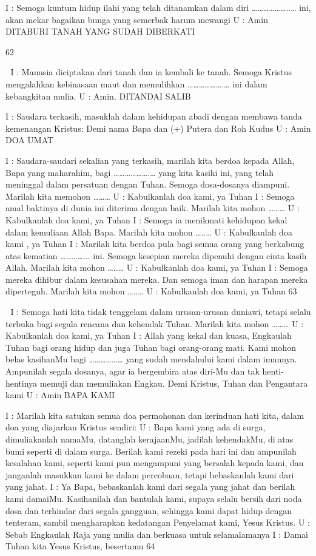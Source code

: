\documentclass[10pt,a5paper,fancyhdr]{memoir}
\begin{document}
I : Semoga kuntum hidup ilahi yang telah ditanamkan dalam diri 
………………..… ini, akan mekar bagaikan bunga yang semerbak 
harum mewangi 
U : Amin 
DITABURI TANAH YANG SUDAH DIBERKATI 

62 



I : Manusia diciptakan dari tanah dan ia kembali ke tanah. Semoga 
Kristus mengalahkan kebinasaan maut dan memulihkan 
……………….… ini dalam kebangkitan mulia. 
U : Amin. 
DITANDAI SALIB 

I : Saudara terkasih, masuklah dalam kehidupan abadi dengan 
membawa tanda kemenangan Kristus: Demi nama Bapa dan (+) 
Putera dan Roh Kudus 
U : Amin 
DOA UMAT 

I : Saudara-saudari sekalian yang terkasih, marilah kita berdoa 
kepada Allah, Bapa yang maharahim, bagi ……………….… yang 
kita kasihi ini, yang telah meninggal dalam persatuan dengan Tuhan. 
Semoga dosa-dosanya diampuni. Marilah kita memohon ……… 
U : Kabulkanlah doa kami, ya Tuhan 
I : Semoga amal baktinya di dunia ini diterima dengan baik. Marilah 
kita mohon ……… 
U : Kabulkanlah doa kami, ya Tuhan 
I : Semoga ia menikmati kehidupan kekal dalam kemuliaan Allah 
Bapa. Marilah kita mohon …..… 
U : Kabulkanlah doa kami , ya Tuhan 
I : Marilah kita berdoa pula bagi semua orang yang berkabung atas 
kematian …………... ini. Semoga kesepian mereka dipenuhi dengan 
cinta kasih Allah. Marilah kita mohon …..… 
U : Kabulkanlah doa kami, ya Tuhan 
I : Semoga mereka dihibur dalam kesusahan mereka. Dan semoga 
iman dan harapan mereka diperteguh. Marilah kita mohon …..… 
U : Kabulkanlah doa kami, ya Tuhan 
63 



I : Semoga hati kita tidak tenggelam dalam urusan-urusan duniawi, 
tetapi selalu terbuka bagi segala rencana dan kehendak Tuhan. 
Marilah kita mohon ……… 
U : Kabulkanlah doa kami, ya Tuhan 
I : Allah yang kekal dan kuasa, Engkaulah Tuhan bagi orang hidup 
dan juga Tuhan bagi orang-orang mati. Kami mohon belas 
kasihanMu bagi ……………… yang sudah mendahului kami dalam 
imannya. Ampunilah segala dosanya, agar ia bergembira atas diri-Mu 
dan tak henti-hentinya memuji dan memuliakan Engkau. Demi 
Kristus, Tuhan dan Pengantara kami 
U : Amin 
BAPA KAMI 

I : Marilah kita satukan semua doa permohonan dan kerinduan hati 
kita, dalam doa yang diajarkan Kristus sendiri: 
U : Bapa kami yang ada di surga, dimuliakanlah namaMu, datanglah 
kerajaanMu, jadilah kehendakMu, di atas bumi seperti di dalam 
surga. Berilah kami rezeki pada hari ini dan ampunilah kesalahan 
kami, seperti kami pun mengampuni yang bersalah kepada kami, dan 
janganlah masukkan kami ke dalam percobaan, tetapi bebaskanlah 
kami dari yang jahat. 
I : Ya Bapa, bebaskanlah kami dari segala yang jahat dan berilah 
kami damaiMu. Kasihanilah dan bantulah kami, supaya selalu bersih 
dari noda dosa dan terhindar dari segala gangguan, sehingga kami 
dapat hidup dengan tenteram, sambil mengharapkan kedatangan 
Penyelamat kami, Yesus Kristus. 
U : Sebab Engkaulah Raja yang mulia dan berkuasa untuk selamalamanya 
I : Damai Tuhan kita Yesus Kristus, besertamu 
64 
\end{document}
